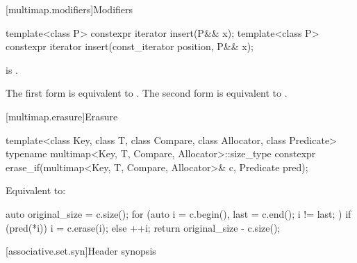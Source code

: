 [multimap.modifiers]{Modifiers}

%
\begin{itemdecl}
template<class P> constexpr iterator insert(P&& x);
template<class P> constexpr iterator insert(const_iterator position, P&& x);
\end{itemdecl}

\begin{itemdescr}
\pnum
\constraints
{} is .

\pnum
\effects
The first form is equivalent to
. The second form is
equivalent to .
\end{itemdescr}

[multimap.erasure]{Erasure}

%
\begin{itemdecl}
template<class Key, class T, class Compare, class Allocator, class Predicate>
  typename multimap<Key, T, Compare, Allocator>::size_type
    constexpr erase_if(multimap<Key, T, Compare, Allocator>& c, Predicate pred);
\end{itemdecl}

\begin{itemdescr}
\pnum
\effects
Equivalent to:
\begin{codeblock}
auto original_size = c.size();
for (auto i = c.begin(), last = c.end(); i != last; ) {
  if (pred(*i)) {
    i = c.erase(i);
  } else {
    ++i;
  }
}
return original_size - c.size();
\end{codeblock}
\end{itemdescr}

[associative.set.syn]{Header  synopsis}%

